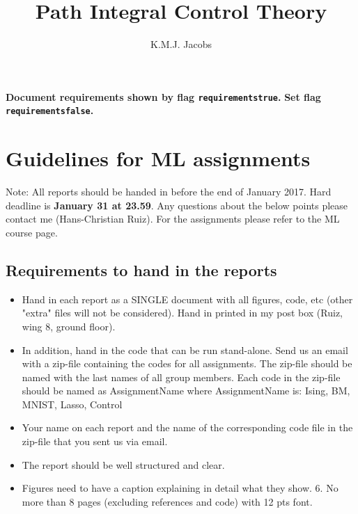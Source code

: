 \documentclass[10pt,a4paper]{article}
\author{K.M.J. Jacobs}
\title{Path Integral Control Theory}
\newif\ifrequirements
\begin{document}
\maketitle

\ifrequirements
\color{red}
\textbf{Document requirements shown by flag \texttt{requirementstrue}.}
\textbf{Set flag \texttt{requirementsfalse}.}

\color{blue}
\section{Guidelines for ML assignments}
Note: All reports should be handed in before the end of January 2017. Hard deadline is \textbf{January 31 at 23.59}. Any questions about the below points please contact me (Hans-Christian Ruiz). For the assignments please refer to the ML course page.

\subsection{Requirements to hand in the reports}
\begin{itemize}
\item Hand in each report as a SINGLE document with all figures, code, etc (other "extra" files will not be considered). Hand in printed in my post box (Ruiz, wing 8, ground floor).
\item In addition, hand in the code that can be run stand-alone. Send us an email with a zip-file containing the codes for all assignments. The zip-file should be named with the last names of all group members. Each code in the zip-file should be named as AssignmentName where AssignmentName is: Ising, BM, MNIST, Lasso, Control
\item Your name on each report and the name of the corresponding code file in the zip-file that you sent us via email.
\item The report should be well structured and clear.
\item Figures need to have a caption explaining in detail what they show. 6. No more than 8 pages (excluding references and code) with 12 pts font.
\end{itemize}
\end{document}
